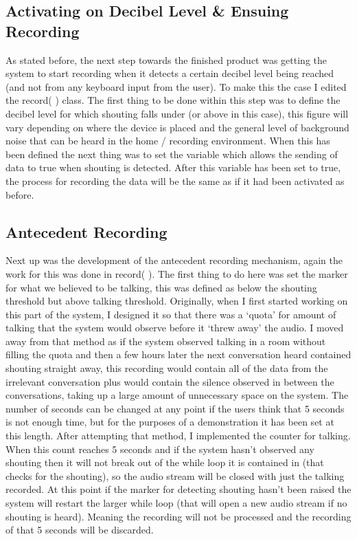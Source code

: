 \documentclass[a4paper,11pt]{report}
\begin{document}
\subsection{Activating on Decibel Level \& Ensuing Recording}
As stated before, the next step towards the finished product was getting the system to start recording when it detects a certain decibel level being reached (and not from any keyboard input from the user). To make this the case I edited the record( ) class. The first thing to be done within this step was to define the decibel level for which shouting falls under (or above in this case), this figure will vary depending on where the device is placed and the general level of background noise that can be heard in the home / recording environment. When this has been defined the next thing was to set the variable which allows the sending of data to true when shouting is detected. After this variable has been set to true, the process for recording the data will be the same as if it had been activated as before.

\subsection{Antecedent Recording}
Next up was the development of the antecedent recording mechanism, again the work for this was done in record( ). The first thing to do here was set the marker for what we believed to be talking, this was defined as below the shouting threshold but above talking threshold. Originally, when I first started working on this part of the system, I designed it so that there was a ‘quota’ for amount of talking that the system would observe before it ‘threw away’ the audio. I moved away from that method as if the system observed talking in a room without filling the quota and then a few hours later the next conversation heard contained shouting straight away, this recording would contain all of the data from the irrelevant conversation plus would contain the silence observed in between the conversations, taking up a large amount of unnecessary space on the system. The number of seconds can be changed at any point if the users think that 5 seconds is not enough time, but for the purposes of a demonstration it has been set at this length. After attempting that method, I implemented the counter for talking. When this count reaches 5 seconds and if the system hasn’t observed any shouting then it will not break out of the while loop it is contained in (that checks for the shouting), so the audio stream will be closed with just the talking recorded. At this point if the marker for detecting shouting hasn’t been raised the system will restart the larger while loop (that will open a new audio stream if no shouting is heard). Meaning the recording will not be processed and the recording of that 5 seconds will be discarded.
\end{document}
